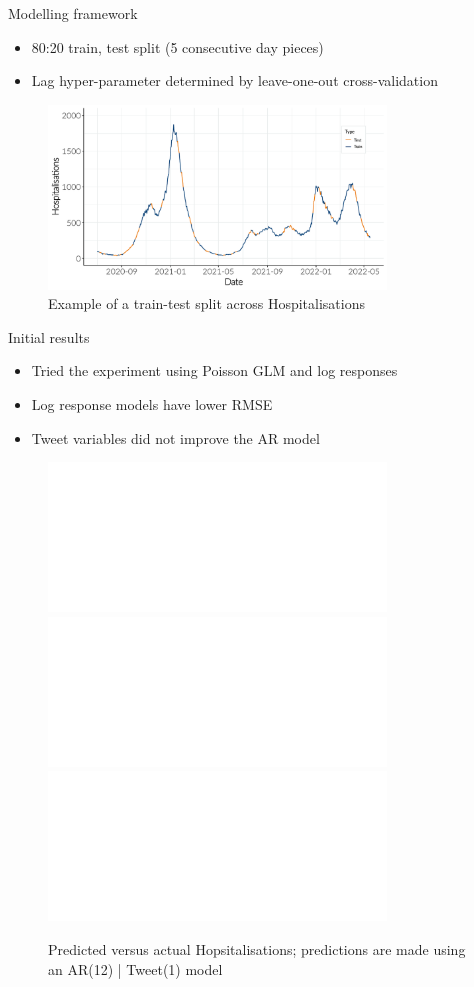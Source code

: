 \documentclass{beamer}
\begin{document}
\begin{frame}{Modelling framework}
  \begin{itemize}
  \item 80:20 train, test split (5 consecutive day pieces) \\[5pt]
  \item Lag hyper-parameter determined by leave-one-out cross-validation 
  \end{itemize}
 \begin{figure}[!ht]
    \centering
    \includegraphics[width=0.8\textwidth]{figures/train_test_split.pdf} 
    \caption{Example of a train-test split across Hospitalisations}
  \end{figure}
\end{frame}

\begin{frame}{Initial results}
  \begin{itemize}
   \item Tried the experiment using Poisson GLM and log responses\\[3pt]
   \item Log response models have lower RMSE \\[3pt]
   \item Tweet variables did not improve the AR model
   \end{itemize}
  
  \begin{figure}[!ht]
    \centering
    \includegraphics<1>[width=0.8\textwidth]{figures/result_plot_full.pdf}%
    \includegraphics<2>[width=0.8\textwidth]{figures/result_plot_train_p.pdf}%
    \includegraphics<3>[width=0.8\textwidth]{figures/result_plot_test_p.pdf}%
    \caption{Predicted versus actual Hopsitalisations; predictions are
      made using an AR(12) | Tweet(1) model  }
  \end{figure}
\end{frame}
\end{document}
